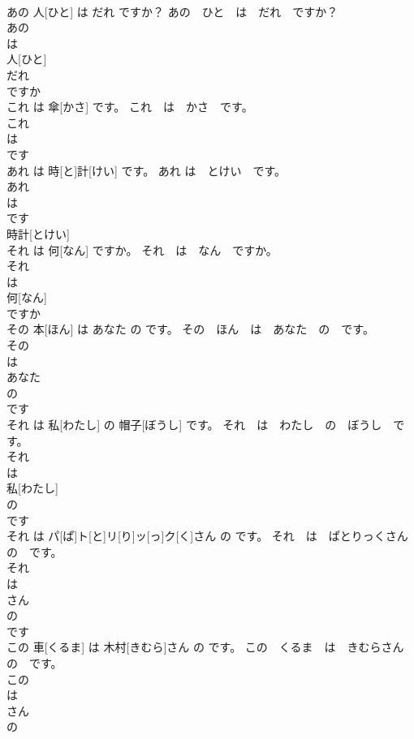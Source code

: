 \documentclass[8pt]{extreport}
\begin{document}
\begin{CJK}{UTF8}{min}
\\	あの 人[ひと] は だれ ですか？	あの　ひと　は　だれ　ですか？	
\\	あの 
\\	は 
\\	人[ひと] 
\\	だれ 
\\	ですか 
\\	これ は 傘[かさ] です。	これ　は　かさ　です。	
\\	これ 
\\	は 
\\	です 
\\	あれ は 時[と]計[けい] です。	あれ は　とけい　です。	
\\	あれ 
\\	は 
\\	です 
\\	時計[とけい]		
\\	それ は 何[なん] ですか。	それ　は　なん　ですか。	
\\	それ 
\\	は 
\\	何[なん] 
\\	ですか 
\\	その 本[ほん] は あなた の です。	その　ほん　は　あなた　の　です。	
\\	その 
\\	は 
\\	あなた 
\\	の 
\\	です 
\\	それ は 私[わたし] の 帽子[ぼうし] です。	それ　は　わたし　の　ぼうし　です。	
\\	それ 
\\	は 
\\	私[わたし] 
\\	の 
\\	です 
\\	それ は パ[ぱ]ト[と]リ[り]ッ[っ]ク[く]さん の です。	それ　は　ぱとりっくさん　の　です。	
\\	それ 
\\	は 
\\	さん 
\\	の 
\\	です 
\\	この 車[くるま] は 木村[きむら]さん の です。	この　くるま　は　きむらさん　の　です。	
\\	この 
\\	は 
\\	さん 
\\	の 

\end{CJK}
\end{document}

